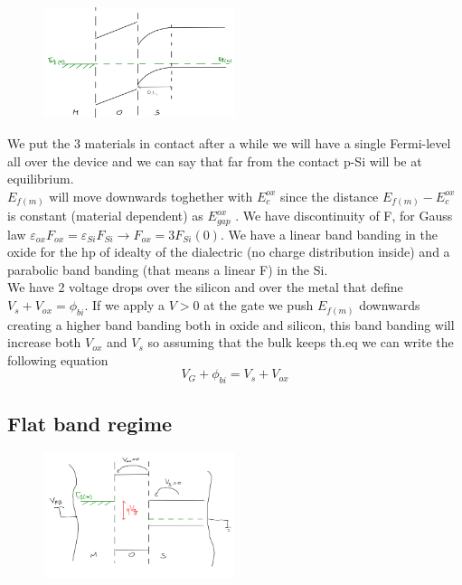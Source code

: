 \begin{figure}
\includegraphics[width=0.5\textwidth]{mos_theq.png}
\end{figure}

We put the 3 materials in contact after a while we will have a single Fermi-level all over the device and we can say that far from the contact p-Si will be at equilibrium.\\
$E_{f(m)}$ will move downwards toghether with $E_c^{ox}$ since the distance $E_{f(m)}-E_c^{ox}$ is constant (material dependent) as $E_{gap}^{ox}$ .
We have discontinuity of F, for Gauss law $\varepsilon_{ox}F_{ox}=\varepsilon_{Si}F_{Si}\rightarrow F_{ox}=3F_{Si}(0)$. We have a linear band banding in the oxide for the hp of idealty of the dialectric (no charge distribution inside) and a parabolic band banding (that means a linear F) in the Si.\\
We have 2 voltage drops over the silicon and over the metal that define $V_s+V_{ox}=\phi_{bi}$.
If we apply a $V>0$ at the gate we push $E_{f(m)}$ downwards creating a higher band banding both in oxide and silicon, this band banding will increase both $V_{ox}$ and $V_{s}$ so assuming that the bulk keeps th.eq we can write the following equation
\begin{equation}
V_{G}+\phi_{bi}=V_s+V_{ox}
\end{equation}
\subsection{Flat band regime}
\begin{figure}
\includegraphics[width=0.5\textwidth]{mos_vfb.png}
\end{figure}

